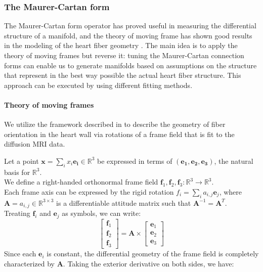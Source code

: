 \subsubsection{The Maurer-Cartan form}

The Maurer-Cartan form operator has proved useful in measuring the differential structure of a manifold, and the theory of moving frame has shown good results in the modeling of the heart fiber geometry \cite{pami2015}. The main idea is to apply the theory of moving frames but reverse it: tuning the Maurer-Cartan connection forms can enable us to generate manifolds based on assumptions on the structure that represent in the best way possible the actual heart fiber structure. This approach can be executed by using different fitting methods.

\paragraph{Theory of moving frames}

We utilize the framework described in \cite{de1990ventricular} to describe the geometry of fiber orientation in the heart wall via rotations of a frame field that is fit to the diffusion MRI data. 

Let a point $\mathbf{x} = \sum_i{x_i\mathbf{e_i}} \in \mathbb{R}^3$ be expressed in terms of $(\mathbf{e_1}, \mathbf{e_2}, \mathbf{e_3})$, the natural basis for $\mathbb{R}^3$.\\
We define a right-handed orthonormal frame field $\mathbf{f}_1,\mathbf{f}_2,\mathbf{f}_3 : \mathbb{R}^3 \to \mathbb{R}^3$.\\
Each frame axis can be expressed by the rigid rotation $f_i = \sum_i{a_{i,j}\mathbf{e}_j}$, where $\mathbf{A} = {a_{i,j}} \in \mathbb{R}^{3 \times 3}$ is a differentiable attitude matrix such that $\mathbf{A}^{-1} = \mathbf{A}^T$.\\
Treating $\mathbf{f}_i$ and $\mathbf{e}_j$ as symbols, we can write:
\begin{equation}
\begin{bmatrix}
    \mathbf{f}_1 \\
    \mathbf{f}_2 \\
    \mathbf{f}_3
\end{bmatrix} = \mathbf{A} \times \begin{bmatrix}
    \mathbf{e}_1 \\
    \mathbf{e}_2 \\
    \mathbf{e}_3
\end{bmatrix}
\end{equation}
Since each $\mathbf{e}_i$ is constant, the differential geometry of the frame field is completely characterized by $\mathbf{A}$. Taking the exterior derivative on both sides, we have:

